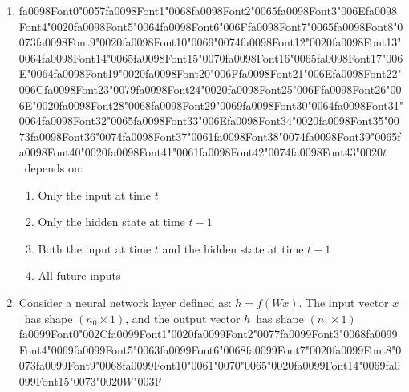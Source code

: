 \documentclass[12pt]{article}
\begin{document}
\begin{enumerate}[label=Q\arabic*.]
\begin{enumerate}[label=(\Alph*)]
    \item The current word given itself
    \item All words simultaneously
\end{enumerate}
\item {\csname fa0098Font0\endcsname\char"0057}{\csname fa0098Font1\endcsname\char"0068}{\csname fa0098Font2\endcsname\char"0065}{\csname fa0098Font3\endcsname\char"006E}{\csname fa0098Font4\endcsname\char"0020}{\csname fa0098Font5\endcsname\char"0064}{\csname fa0098Font6\endcsname\char"006F}{\csname fa0098Font7\endcsname\char"0065}{\csname fa0098Font8\endcsname\char"0073}{\csname fa0098Font9\endcsname\char"0020}{\csname fa0098Font10\endcsname\char"0069}{\char"0074}{\csname fa0098Font12\endcsname\char"0020}{\csname fa0098Font13\endcsname\char"0064}{\csname fa0098Font14\endcsname\char"0065}{\csname fa0098Font15\endcsname\char"0070}{\csname fa0098Font16\endcsname\char"0065}{\csname fa0098Font17\endcsname\char"006E}{\char"0064}{\csname fa0098Font19\endcsname\char"0020}{\csname fa0098Font20\endcsname\char"006F}{\csname fa0098Font21\endcsname\char"006E}{\csname fa0098Font22\endcsname\char"006C}{\csname fa0098Font23\endcsname\char"0079}{\csname fa0098Font24\endcsname\char"0020}{\csname fa0098Font25\endcsname\char"006F}{\csname fa0098Font26\endcsname\char"006E}{\char"0020}{\csname fa0098Font28\endcsname\char"0068}{\csname fa0098Font29\endcsname\char"0069}{\csname fa0098Font30\endcsname\char"0064}{\csname fa0098Font31\endcsname\char"0064}{\csname fa0098Font32\endcsname\char"0065}{\csname fa0098Font33\endcsname\char"006E}{\csname fa0098Font34\endcsname\char"0020}{\csname fa0098Font35\endcsname\char"0073}{\csname fa0098Font36\endcsname\char"0074}{\csname fa0098Font37\endcsname\char"0061}{\csname fa0098Font38\endcsname\char"0074}{\csname fa0098Font39\endcsname\char"0065}{\csname fa0098Font40\endcsname\char"0020}{\csname fa0098Font41\endcsname\char"0061}{\csname fa0098Font42\endcsname\char"0074}{\csname fa0098Font43\endcsname\char"0020}$t$\  depends on:
\begin{enumerate}[label=(\Alph*)]
    \item Only the input at time $t$
    \item Only the hidden state at time $t-1$
    \item Both the input at time $t$ and the hidden state at time $t-1$
    \item All future inputs
\end{enumerate}
\item Consider a neural network layer defined as: $h = f(Wx)$. The input vector $x$\  has shape $(n_0 \times 1)$, and the output vector $h$\  has shape $(n_1 \times 1)${\csname fa0099Font0\endcsname\char"002C}{\csname fa0099Font1\endcsname\char"0020}{\csname fa0099Font2\endcsname\char"0077}{\csname fa0099Font3\endcsname\char"0068}{\csname fa0099Font4\endcsname\char"0069}{\csname fa0099Font5\endcsname\char"0063}{\csname fa0099Font6\endcsname\char"0068}{\csname fa0099Font7\endcsname\char"0020}{\csname fa0099Font8\endcsname\char"0073}{\csname fa0099Font9\endcsname\char"0068}{\csname fa0099Font10\endcsname\char"0061}{\char"0070}{\char"0065}{\char"0020}{\csname fa0099Font14\endcsname\char"0069}{\csname fa0099Font15\endcsname\char"0073}{\char"0020}$W${\char"003F}

\end{enumerate}
\end{document}
